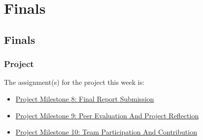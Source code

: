 \clearpage

\renewcommand{\ChapTitle}{Finals}
\renewcommand{\SectionTitle}{Finals}

\chapter{\ChapTitle}

\section{\SectionTitle}

\subsection{Project}

The assignment(s) for the project this week is:

\begin{itemize}
    \item \href{https://applied.cs.colorado.edu/mod/assign/view.php?id=61503}{Project Milestone 8: Final Report Submission}
    \item \href{https://applied.cs.colorado.edu/mod/assign/view.php?id=61504}{Project Milestone 9: Peer Evaluation And Project Reflection}
    \item \href{https://applied.cs.colorado.edu/mod/assign/view.php?id=61505}{Project Milestone 10: Team Participation And Contribution}
\end{itemize}